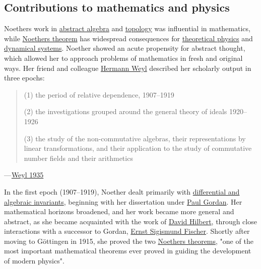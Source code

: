 \subsection{Contributions to mathematics and physics}\label{Contributions_to_mathematics_and_physics}

Noether\textquotesingle s work in \href{https://en.wikipedia.org/wiki/Abstract_algebra}{abstract algebra} and \href{https://en.wikipedia.org/wiki/Topology}{topology} was influential in mathematics, while \href{https://en.wikipedia.org/wiki/Noether's_theorem}{Noether\textquotesingle s theorem} has widespread consequences for \href{https://en.wikipedia.org/wiki/Theoretical_physics}{theoretical physics} and \href{https://en.wikipedia.org/wiki/Dynamical_system}{dynamical systems}. Noether showed an acute propensity for abstract thought, which allowed her to approach problems of mathematics in fresh and original ways. Her friend and colleague \href{https://en.wikipedia.org/wiki/Hermann_Weyl}{Hermann Weyl} described her scholarly output in three epochs:

\begin{quote}
(1) the period of relative dependence, 1907--1919

(2) the investigations grouped around the general theory of ideals 1920--1926

(3) the study of the non-commutative algebras, their representations by linear transformations, and their application to the study of commutative number fields and their arithmetics
\end{quote}


---{ }\href{https://en.wikipedia.org/wiki/Emmy_Noether\#CITEREFWeyl1935}{Weyl 1935}{}

In the first epoch (1907--1919), Noether dealt primarily with \href{https://en.wikipedia.org/wiki/Invariant_theory}{differential and algebraic invariants}, beginning with her dissertation under \href{https://en.wikipedia.org/wiki/Paul_Gordan}{Paul Gordan}. Her mathematical horizons broadened, and her work became more general and abstract, as she became acquainted with the work of \href{https://en.wikipedia.org/wiki/David_Hilbert}{David Hilbert}, through close interactions with a successor to Gordan, \href{https://en.wikipedia.org/wiki/Ernst_Sigismund_Fischer}{Ernst Sigismund Fischer}. Shortly after moving to Göttingen in 1915, she proved the two \href{https://en.wikipedia.org/wiki/Noether's_theorem}{Noether\textquotesingle s theorems}, "one of the most important mathematical theorems ever proved in guiding the development of modern physics".


